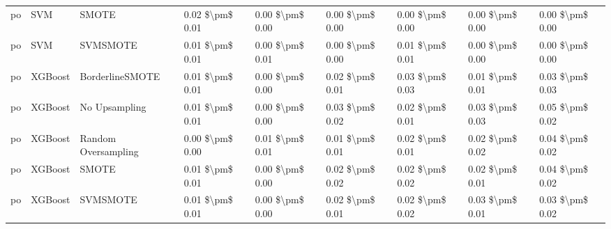 \begin{tabular}{lllllllll}
      po &                             SVM &                         SMOTE & 0.02 \$\textbackslash pm\$ 0.01 &           0.00 \$\textbackslash pm\$ 0.00 &       0.00 \$\textbackslash pm\$ 0.00 &        0.00 \$\textbackslash pm\$ 0.00 &                         0.00 \$\textbackslash pm\$ 0.00 &     0.00 \$\textbackslash pm\$ 0.00 \\
      po &                             SVM &                      SVMSMOTE & 0.01 \$\textbackslash pm\$ 0.01 &           0.00 \$\textbackslash pm\$ 0.01 &       0.00 \$\textbackslash pm\$ 0.00 &        0.01 \$\textbackslash pm\$ 0.01 &                         0.00 \$\textbackslash pm\$ 0.00 &     0.00 \$\textbackslash pm\$ 0.00 \\
      po &                         XGBoost &               BorderlineSMOTE & 0.01 \$\textbackslash pm\$ 0.01 &           0.00 \$\textbackslash pm\$ 0.00 &       0.02 \$\textbackslash pm\$ 0.01 &        0.03 \$\textbackslash pm\$ 0.03 &                         0.01 \$\textbackslash pm\$ 0.01 &     0.03 \$\textbackslash pm\$ 0.03 \\
      po &                         XGBoost &                 No Upsampling & 0.01 \$\textbackslash pm\$ 0.01 &           0.00 \$\textbackslash pm\$ 0.00 &       0.03 \$\textbackslash pm\$ 0.02 &        0.02 \$\textbackslash pm\$ 0.01 &                         0.03 \$\textbackslash pm\$ 0.03 &     0.05 \$\textbackslash pm\$ 0.02 \\
      po &                         XGBoost &           Random Oversampling & 0.00 \$\textbackslash pm\$ 0.00 &           0.01 \$\textbackslash pm\$ 0.01 &       0.01 \$\textbackslash pm\$ 0.01 &        0.02 \$\textbackslash pm\$ 0.01 &                         0.02 \$\textbackslash pm\$ 0.02 &     0.04 \$\textbackslash pm\$ 0.02 \\
      po &                         XGBoost &                         SMOTE & 0.01 \$\textbackslash pm\$ 0.01 &           0.00 \$\textbackslash pm\$ 0.00 &       0.02 \$\textbackslash pm\$ 0.02 &        0.02 \$\textbackslash pm\$ 0.02 &                         0.02 \$\textbackslash pm\$ 0.01 &     0.04 \$\textbackslash pm\$ 0.02 \\
      po &                         XGBoost &                      SVMSMOTE & 0.01 \$\textbackslash pm\$ 0.01 &           0.00 \$\textbackslash pm\$ 0.00 &       0.02 \$\textbackslash pm\$ 0.01 &        0.02 \$\textbackslash pm\$ 0.02 &                         0.03 \$\textbackslash pm\$ 0.01 &     0.03 \$\textbackslash pm\$ 0.02 \\

\end{tabular}
